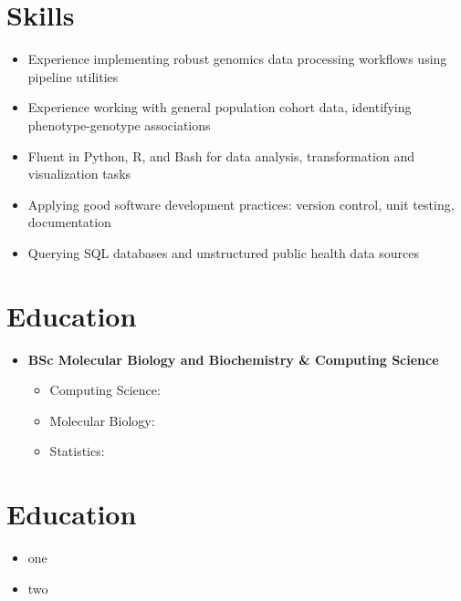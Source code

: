 \documentclass{article}
\newcommand{\customitem}{\item[] \hspace{-.85cm}}
\newcommand{\customsection}[1]{\section*{#1} \vspace{-.3cm} \hrulefill}
\begin{document}
\customsection{Skills}
\begin{itemize}
  \customitem Experience implementing robust genomics data processing workflows using pipeline utilities
  \customitem Experience working with general population cohort data, identifying phenotype-genotype associations
  \customitem Fluent in Python, R, and Bash for data analysis, transformation and visualization tasks
  \customitem Applying good software development practices: version control, unit testing, documentation
  \customitem Querying SQL databases and unstructured public health data sources
\end{itemize}

\customsection{Education}
\begin{itemize}
\customitem \textbf{BSc Molecular Biology and Biochemistry \& Computing Science}
    \begin{itemize}
      \customitem Computing Science:
      \customitem Molecular Biology:
      \customitem Statistics:
    \end{itemize}
\end{itemize}

\customsection{Education}
\begin{itemize}
  \customitem one
  \customitem two
\end{itemize}
\end{document}
